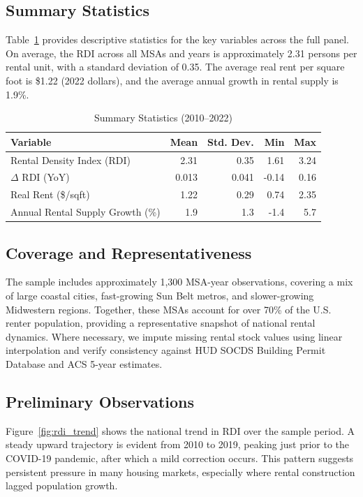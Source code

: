 \documentclass[APA,Times1COL]{WileyNJDv5} %
\begin{document}
\subsection{Summary Statistics}
Table~\ref{tab:summary_stats} provides descriptive statistics for the key variables across the full panel. On average, the RDI across all MSAs and years is approximately 2.31 persons per rental unit, with a standard deviation of 0.35. The average real rent per square foot is \$1.22 (2022 dollars), and the average annual growth in rental supply is 1.9\%.

\begin{table}[t]
	\centering
	\caption*{Summary Statistics (2010--2022)}\label{tab:summary_stats}
	\begin{tabular}{lrrrr}
		\toprule
		Variable & Mean & Std. Dev. & Min & Max \\
		\midrule
		Rental Density Index (RDI) & 2.31 & 0.35 & 1.61 & 3.24 \\
		\(\Delta\) RDI (YoY) & 0.013 & 0.041 & -0.14 & 0.16 \\
		Real Rent (\$/sqft) & 1.22 & 0.29 & 0.74 & 2.35 \\
		Annual Rental Supply Growth (\%) & 1.9 & 1.3 & -1.4 & 5.7 \\
		\bottomrule
	\end{tabular}
\end{table}

\subsection{Coverage and Representativeness}
The sample includes approximately 1,300 MSA-year observations, covering a mix of large coastal cities, fast-growing Sun Belt metros, and slower-growing Midwestern regions. Together, these MSAs account for over 70\% of the U.S. renter population, providing a representative snapshot of national rental dynamics. Where necessary, we impute missing rental stock values using linear interpolation and verify consistency against HUD SOCDS Building Permit Database and ACS 5-year estimates.

\subsection{Preliminary Observations}

Figure~\ref{fig:rdi_trend} shows the national trend in RDI over the sample period. A steady upward trajectory is evident from 2010 to 2019, peaking just prior to the COVID-19 pandemic, after which a mild correction occurs. This pattern suggests persistent pressure in many housing markets, especially where rental construction lagged population growth.
\end{document}
